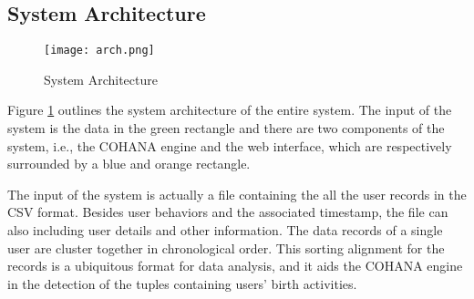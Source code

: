 
\subsection{System Architecture}

\begin{figure}
    \centering
    \texttt{[image: arch.png]}
    \vspace{-1em}
    \caption{System Architecture}
    \label{fig:sys_arch}
    \vspace{-2em}
\end{figure}

Figure \ref{fig:sys_arch} outlines the system architecture of the entire system. The input of the system is the data in the green rectangle and there are two components of the system, i.e., the COHANA engine and the web interface, which are respectively surrounded by a blue and orange rectangle. 

The input of the system is actually a file containing the all the user records in the CSV format. 
Besides user behaviors and the associated timestamp, the file can also 
including user details and other information.
The data records of a single user are cluster together in chronological order. 
This sorting alignment for the records is a ubiquitous format for data analysis, and it aids the COHANA engine in the detection of the tuples containing users' birth activities.

